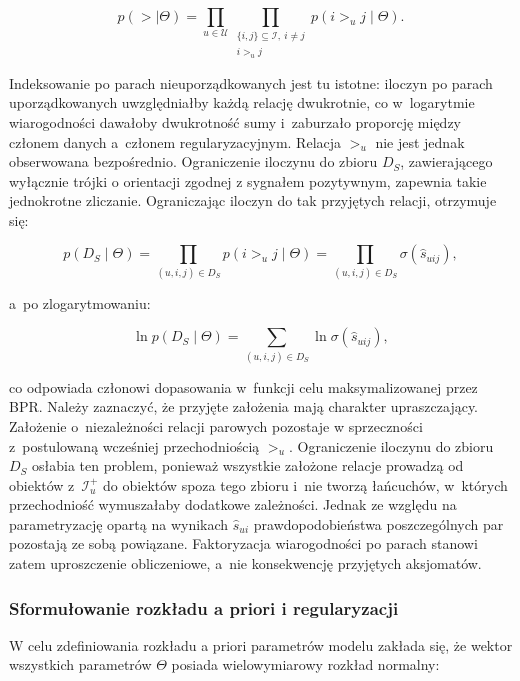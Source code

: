 \begin{equation}
p(> \mid \Theta) = \prod_{u \in \mathcal{U}} \prod_{\substack{\{i,j\} \subseteq \mathcal{I},\ i \neq j \\ i >_u j}} p(i >_u j \mid \Theta).
\end{equation}

Indeksowanie po parach nieuporządkowanych jest tu istotne: iloczyn po parach uporządkowanych uwzględniałby każdą relację dwukrotnie, co w~logarytmie wiarogodności dawałoby dwukrotność sumy i~zaburzało proporcję między członem danych a~członem regularyzacyjnym. Relacja $>_u$ nie jest jednak obserwowana bezpośrednio. Ograniczenie iloczynu do zbioru $D_S$, zawierającego wyłącznie trójki o orientacji zgodnej z sygnałem pozytywnym, zapewnia takie jednokrotne zliczanie. Ograniczając iloczyn do tak przyjętych relacji, otrzymuje się:

\begin{equation}
p(D_S \mid \Theta) = \prod_{(u,i,j)\in D_S} p(i >_u j \mid \Theta) = \prod_{(u,i,j)\in D_S} \sigma(\hat{s}_{uij}),
\end{equation}

a~po zlogarytmowaniu:

\begin{equation}
\ln p(D_S \mid \Theta) = \sum_{(u,i,j)\in D_S} \ln \sigma(\hat{s}_{uij}),
\end{equation}

co odpowiada członowi dopasowania w~funkcji celu maksymalizowanej przez BPR. Należy zaznaczyć, że przyjęte założenia mają charakter upraszczający. Założenie o~niezależności relacji parowych pozostaje w sprzeczności z~postulowaną wcześniej przechodniością $>_u$. Ograniczenie iloczynu do zbioru $D_S$ osłabia ten problem, ponieważ wszystkie założone relacje prowadzą od obiektów z~$\mathcal{I}_u^+$ do obiektów spoza tego zbioru i~nie tworzą łańcuchów, w~których przechodniość wymuszałaby dodatkowe zależności. Jednak ze względu na parametryzację opartą na wynikach $\hat{s}_{ui}$ prawdopodobieństwa poszczególnych par pozostają ze sobą powiązane. Faktoryzacja wiarogodności po parach stanowi zatem uproszczenie obliczeniowe, a~nie konsekwencję przyjętych aksjomatów.

\subsubsection{Sformułowanie rozkładu a priori i regularyzacji}

W celu zdefiniowania rozkładu a priori parametrów modelu zakłada się, że wektor wszystkich parametrów $\Theta$ posiada wielowymiarowy rozkład normalny:


